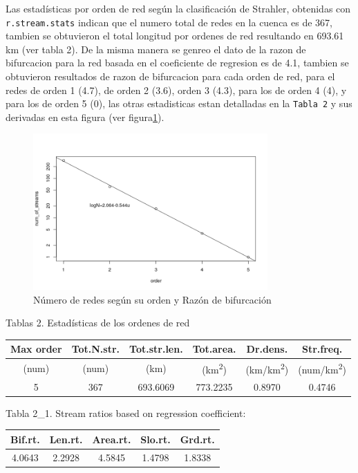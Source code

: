 \documentclass[11pt,]{article}
\begin{document}
Las estadísticas por orden de red según la clasificación de Strahler,
obtenidas con \texttt{r.stream.stats} indican que el numero total de
redes en la cuenca es de 367, tambien se obtuvieron el total longitud
por ordenes de red resultando en 693.61 km (ver tabla 2). De la misma
manera se genreo el dato de la razon de bifurcacion para la red basada
en el coeficiente de regresion es de 4.1, tambien se obtuvieron
resultados de razon de bifurcacion para cada orden de red, para el redes
de orden 1 (4.7), de orden 2 (3.6), orden 3 (4.3), para los de orden 4
(4), y para los de orden 5 (0), las otras estadisticas estan detalladas
en la \texttt{Tabla\ 2} y sus derivadas en esta figura (ver
figura\ref {grafnumero}).

\begin{figure}
\centering
\includegraphics[width=0.80000\textwidth]{Numero de red segun su orden.png}
\caption{Número de redes según su orden y Razón de
bifurcación\label{grafnumero}}
\end{figure}

Tablas 2. Estadísticas de los ordenes de red

\begin{longtable}[]{@{}cccccc@{}}
\toprule
Max order & Tot.N.str. & Tot.str.len. & Tot.area. & Dr.dens. &
Str.freq.\tabularnewline
\midrule
\endhead
(num) & (num) & (km) & (km\textsuperscript{2}) &
(km/km\textsuperscript{2}) & (num/km\textsuperscript{2})\tabularnewline
5 & 367 & 693.6069 & 773.2235 & 0.8970 & 0.4746\tabularnewline
\bottomrule
\end{longtable}

Tabla 2\_1. Stream ratios based on regression coefficient:

\begin{longtable}[]{@{}ccccc@{}}
\toprule
Bif.rt. & Len.rt. & Area.rt. & Slo.rt. & Grd.rt.\tabularnewline
\midrule
\endhead
4.0643 & 2.2928 & 4.5845 & 1.4798 & 1.8338\tabularnewline
\bottomrule
\end{longtable}
\end{document}

